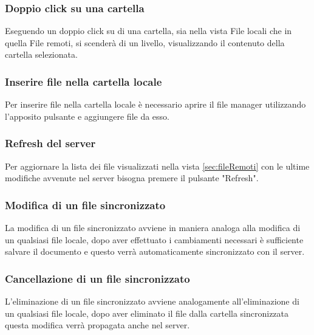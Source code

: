 \subsubsection{Doppio click su una cartella}
Eseguendo un doppio click su di una cartella, sia nella vista File locali che in quella File remoti, si scenderà di un livello, visualizzando il contenuto della cartella selezionata.
\subsubsection{Inserire file nella cartella locale}
Per inserire file nella cartella locale è necessario aprire il file manager utilizzando l'apposito pulsante e aggiungere file da esso.
\subsubsection{Refresh del server}
Per aggiornare la lista dei file visualizzati nella vista \ref{sec:fileRemoti} con le ultime modifiche avvenute nel server bisogna premere il pulsante "Refresh".
\subsubsection{Modifica di un file sincronizzato}
La modifica di un file sincronizzato avviene in maniera analoga alla modifica di un qualsiasi file locale, dopo aver effettuato i cambiamenti necessari è sufficiente salvare il documento e questo verrà automaticamente sincronizzato con il server.
\subsubsection{Cancellazione di un file sincronizzato}
L'eliminazione di un file sincronizzato avviene analogamente all'eliminazione di un qualsiasi file locale, dopo aver eliminato il file dalla cartella sincronizzata questa modifica verrà propagata anche nel server.

